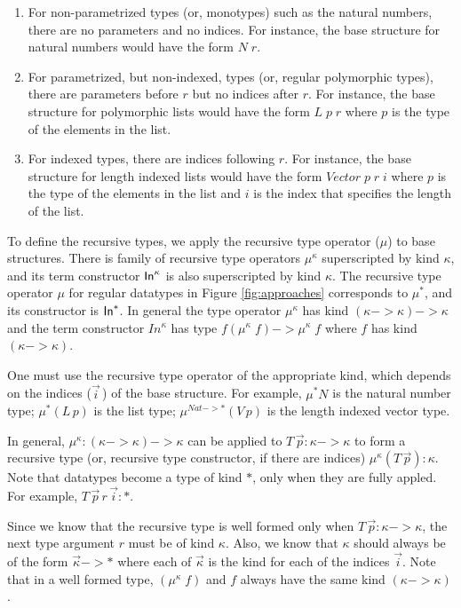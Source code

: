 \begin{enumerate}

\item For non-parametrized types (or, monotypes) such as the natural numbers,
there are no parameters and no indices. For instance, the base structure
for natural numbers would have the form $N\;r$. 

\item For parametrized,
but non-indexed, types (or, regular polymorphic types), there are parameters
before $r$ but no indices after $r$. For instance, the base structure for
polymorphic lists would have the form $L\;p\;r$ where $p$ is the type of
the elements in the list. 

\item For indexed types, there are indices following $r$.
For instance, the base structure for length indexed lists would have the
form $Vector\;p\;r\;i$ where $p$ is the type of the elements in the list and
$i$ is the index that specifies the length of the list.

\end{enumerate}

To define the recursive types, we apply the recursive type operator ($\mu$) to
base structures. There is  family of recursive type operators $\mu^\kappa$
superscripted by kind $\kappa$, and its term constructor $\textsf{In}^\kappa$ is also
superscripted by kind $\kappa$. The recursive type operator $\mu$
for regular datatypes in Figure \ref{fig:approaches} corresponds to $\mu^{*}$,
and its constructor is $\textsf{In}^{*}$. In general the type operator $\mu^\kappa$
has kind $(\kappa -> \kappa) -> \kappa$ and the term constructor
$In^\kappa$ has type $f (\mu^\kappa\; f) -> \mu^\kappa\; f$ where
$f$ has kind $(\kappa -> \kappa)$.

One must use the recursive type operator of the appropriate kind,
which depends on the indices ($\vec{i}\,$) of the base structure.
For example, $\mu^{*}N$ is the natural number type;
$\mu^{*}(L\,p)$ is the list type; $\mu^{\textit{Nat}-> *}(V\,p)$ is the length indexed vector type.

In general, $\mu^\kappa : (\kappa -> \kappa) -> \kappa$ can be
applied to $T\,\vec{p} : \kappa -> \kappa$ to form a recursive type
(or, recursive type constructor, if there are indices)
$\mu^\kappa(T\,\vec{p}) : \kappa$. Note that datatypes become a type of kind $*$, 
only when they are fully appled. For example,
$T\,\vec{p}\,r\,\vec{i} : *$. 

Since we know that the recursive type is
well formed only when $T\,\vec{p} : \kappa -> \kappa$,
the next type argument $r$ must be of kind $\kappa$.
Also, we know that $\kappa$ should always be of the form
$\vec{\kappa} -> *$ where each of $\vec{\kappa}$ is the kind for
each of the indices $\vec{i}$. Note that in a well formed
type, $(\mu^\kappa\; f)$ and $f$ always have the same
kind $(\kappa -> \kappa)$.

